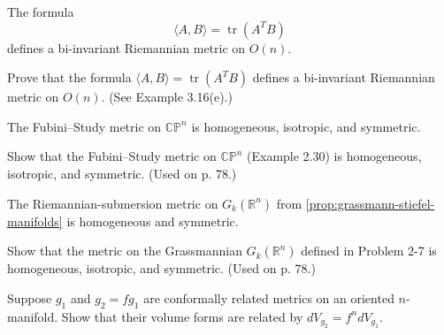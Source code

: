 \begin{proposition}
\label{prop:orthogonal-group-bi-invariant-metric}
The formula
\[
\langle A,B\rangle=\operatorname{tr}(A^TB)
\]
defines a bi-invariant Riemannian metric on $O(n)$.
\end{proposition}

\begin{exercise}
\label{prob:orthogonal-group-bi-invariant-metric}
Prove that the formula $\langle A, B \rangle = \operatorname{tr}(A^T B)$ defines a bi-invariant Riemannian metric on $O(n)$. (See Example 3.16(e).)
\end{exercise}


\begin{proposition}
\label{prop:fubini-study-metric-homogeneous}
The Fubini--Study metric on $\mathbb{CP}^n$ is homogeneous, isotropic, and
symmetric.
\end{proposition}

\begin{exercise}\label{prob:fubini-study-metric-homogeneous}
Show that the Fubini--Study metric on $\mathbb{CP}^n$ (Example 2.30) is homogeneous, isotropic, and symmetric. (Used on p. 78.)
\end{exercise}


\begin{proposition}
\label{prop:grassmannian-metric-homogeneous}
The Riemannian-submersion metric on $G_k(\mathbb R^n)$ from
\cref{prop:grassmann-stiefel-manifolds} is homogeneous and symmetric.
\end{proposition}

\begin{exercise}\label{prob:grassmannian-metric-homogeneous}
Show that the metric on the Grassmannian $G_k(\mathbb{R}^n)$ defined in Problem 2-7 is homogeneous, isotropic, and symmetric. (Used on p. 78.)
\end{exercise}


\begin{exercise}\label{exer:conformal-volume-forms}
Suppose $g_1$ and $g_2 = f g_1$ are conformally related metrics on an oriented $n$-manifold. Show that their volume forms are related by $d V_{g_2} = f^n d V_{g_1}$.
\end{exercise}

